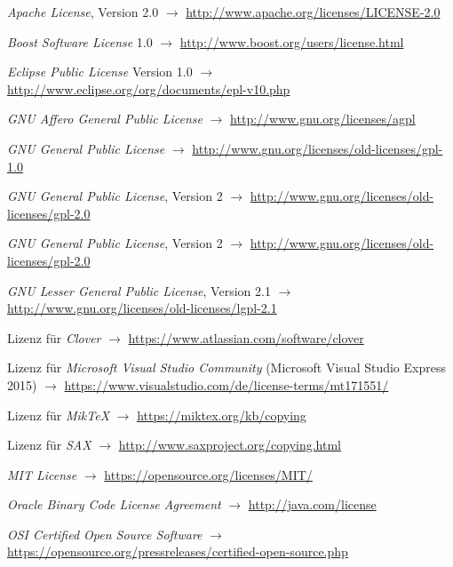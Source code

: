 \documentclass[english,ngerman,parskip=half,headsepline,footsepline]{scrreprt}
\begin{document}
   	\begin{flushleft}
		\begin{thebibliography}{12}
        	
			\emph{Apache License}, Version 2.0 $\rightarrow$ \url{http://www.apache.org/licenses/LICENSE-2.0}
			
			\emph{Boost Software License} 1.0 $\rightarrow$ \url{http://www.boost.org/users/license.html}
			
			\emph{Eclipse Public License} Version 1.0 $\rightarrow$ \url{http://www.eclipse.org/org/documents/epl-v10.php}
			
			\emph{GNU Affero General Public License} $\rightarrow$ \url{http://www.gnu.org/licenses/agpl}
			
			\emph{GNU General Public License} $\rightarrow$ \url{http://www.gnu.org/licenses/old-licenses/gpl-1.0}
			
			\emph{GNU General Public License}, Version 2 $\rightarrow$ \url{http://www.gnu.org/licenses/old-licenses/gpl-2.0}
			
			\emph{GNU General Public License}, Version 2 $\rightarrow$ \url{http://www.gnu.org/licenses/old-licenses/gpl-2.0}
			
			\emph{GNU Lesser General Public License}, Version 2.1 $\rightarrow$ \url{http://www.gnu.org/licenses/old-licenses/lgpl-2.1}
			
			Lizenz für \emph{Clover} $\rightarrow$ \url{https://www.atlassian.com/software/clover}
			
			Lizenz für \emph{Microsoft Visual Studio Community} (Microsoft Visual Studio Express 2015) $\rightarrow$ \url{https://www.visualstudio.com/de/license-terms/mt171551/}
			
			Lizenz für \emph{MikTeX} $\rightarrow$ \url{https://miktex.org/kb/copying}
				
			Lizenz für \emph{SAX} $\rightarrow$ \url{http://www.saxproject.org/copying.html}
			
			\emph{MIT License} $\rightarrow$ \url{https://opensource.org/licenses/MIT/}
			
			\emph{Oracle Binary Code License Agreement} $\rightarrow$ \url{http://java.com/license}
		
			\emph{OSI Certified Open Source Software} $\rightarrow$ \url{https://opensource.org/pressreleases/certified-open-source.php}
			

\end{thebibliography}
\end{flushleft}
\end{document}
